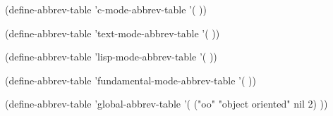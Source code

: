 (define-abbrev-table 'c-mode-abbrev-table '(
    ))

(define-abbrev-table 'text-mode-abbrev-table '(
    ))

(define-abbrev-table 'lisp-mode-abbrev-table '(
    ))

(define-abbrev-table 'fundamental-mode-abbrev-table '(
    ))

(define-abbrev-table 'global-abbrev-table '(
    ("oo" "object oriented" nil 2)
    ))

